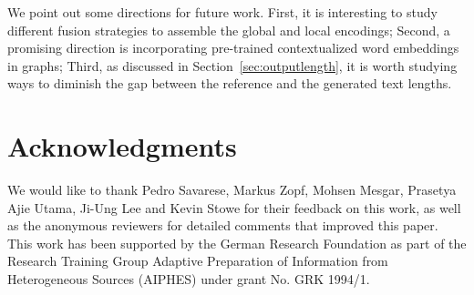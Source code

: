 \documentclass[11pt,a4paper]{article}
\begin{document}
We point out some directions for future work. First, it is interesting to study different fusion strategies to assemble the global and local encodings; Second, a promising direction is incorporating pre-trained contextualized word embeddings in graphs; Third, as discussed in Section~\ref{sec:outputlength}, it is worth studying ways to diminish the gap between the reference and the generated text lengths. 

\section*{Acknowledgments}
We would like to thank Pedro Savarese, Markus Zopf, Mohsen Mesgar, Prasetya Ajie Utama, Ji-Ung Lee and Kevin Stowe for their feedback on this work, as well as the anonymous reviewers for detailed comments that improved this paper.
This work has been supported by the German Research Foundation as part of the Research Training Group Adaptive Preparation of Information from Heterogeneous Sources (AIPHES) under grant No. GRK 1994/1.  




\end{document}

